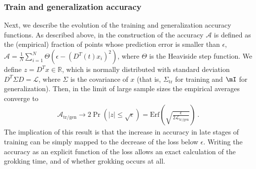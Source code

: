 \documentclass[a4paper,11pt]{article}
\newcommand{\loss}{\mathcal{L}}
\newcommand{\training}{\mathrm{tr}}
\newcommand{\gen}{\mathrm{gen}}
\begin{document}
\subsubsection{Train and generalization accuracy}
Next, we describe the evolution of the training and generalization accuracy functions. 
As described above, in the construction of \cite{liu2023omnigrok} the accuracy $\mathcal{A}$ is defined as the (empirical) fraction of points whose prediction error is smaller than $\epsilon$, $\mathcal{A}
=
\frac{1}{N}
\sum_{i=1}^{N}
 \Theta( \epsilon -  (D^T(t) x_i)^2)$, where $\Theta$ is the Heaviside step function. We define $z=D^T x\in\mathbb{R}$, which is normally distributed with standard deviation $D^T \Sigma D=\loss$, where $\Sigma$  is the covariance of $x$ (that is, $\Sigma_\training$ for training and $\mI$ for generalization). Then, in the limit of large sample sizes the empirical averages converge to
\begin{align}
    \mathcal{A}_{\training/\gen}
    \to 2\Pr\left( |z| \leq  \sqrt{\epsilon} \right)
    =
    \mathrm{Erf}
\left(\sqrt{ \frac{\epsilon}{2 \mathcal{L}_{\training/\gen} }} \right) \ .
\label{eq:accuracy_as_function_of_loss}
\end{align}
The implication of this result is that the increase in accuracy in late stages of training can be simply mapped to the decrease of the loss below $\epsilon$. Writing the accuracy as an explicit function of the loss allows an exact calculation of the grokking time, and of whether grokking occurs at all. 
\end{document}
